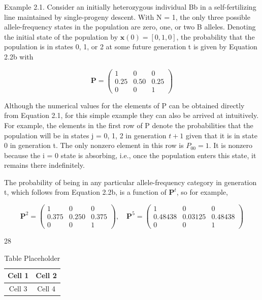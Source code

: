 \documentclass{article}
\begin{document}
Example 2.1. Consider an initially heterozygous individual Bb in a self-fertilizing line maintained by single-progeny descent. With N = 1, the only three possible allele-frequency states in the population are zero, one, or two B alleles. Denoting the initial state of the population by  $ \mathbf{x}(0) = [0, 1, 0] $, the probability that the population is in states 0, 1, or 2 at some future generation t is given by Equation 2.2b with

\begin{equation}
\mathbf{P}=\begin{pmatrix}{{{1}}}&{{{0}}}&{{{0}}} \\{{{0.25}}}&{{{0.50}}}&{{{0.25}}} \\{{{0}}}&{{{0}}}&{{{1}}}\end{pmatrix}
\end{equation}

Although the numerical values for the elements of P can be obtained directly from Equation 2.1, for this simple example they can also be arrived at intuitively. For example, the elements in the first row of P denote the probabilities that the population will be in states j = 0, 1, 2 in generation  $ t + 1 $ given that it is in state 0 in generation t. The only nonzero element in this row is  $ P_{00} = 1 $. It is nonzero because the i = 0 state is absorbing, i.e., once the population enters this state, it remains there indefinitely.

The probability of being in any particular allele-frequency category in generation t, which follows from Equation 2.2b, is a function of  $ \mathbf{P}^{t} $, so for example,

\begin{equation}
\mathbf{P}^{2}=\begin{pmatrix}{{{1}}}&{{{0}}}&{{{0}}} \\{{{0.375}}}&{{{0.250}}}&{{{0.375}}} \\{{{0}}}&{{{0}}}&{{{1}}}\end{pmatrix},\quad\mathbf{P}^{5}=\begin{pmatrix}{{{1}}}&{{{0}}}&{{{0}}} \\{{{0.48438}}}&{{{0.03125}}}&{{{0.48438}}} \\{{{0}}}&{{{0}}}&{{{1}}}\end{pmatrix}
\end{equation}

28

\begin{table}[h]
\centering
\begin{tabular}{|c|c|}
\hline
Cell 1 & Cell 2 \\
\hline
Cell 3 & Cell 4 \\
\hline
\end{tabular}
\caption{Table Placeholder}
\end{table}
\end{document}
